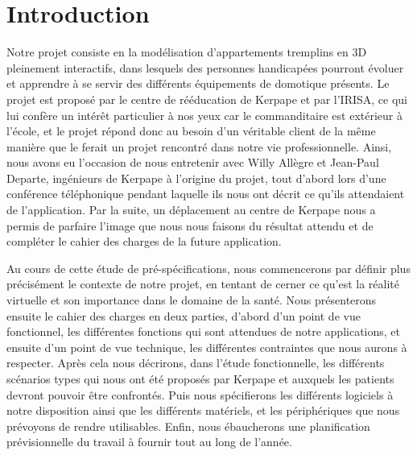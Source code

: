 \section{Introduction}

Notre projet consiste en la modélisation d'appartements tremplins en 3D pleinement interactifs, dans lesquels des personnes handicapées pourront évoluer et apprendre à se servir des différents équipements de domotique présents. 
Le projet est proposé par le centre de rééducation de Kerpape et par l'IRISA, ce qui lui confère un intérêt particulier à nos yeux car le commanditaire est extérieur à l'école, et le projet répond donc au besoin d'un véritable client de la même manière que le ferait un projet rencontré dans notre vie professionnelle. 
Ainsi, nous avons eu l'occasion de nous entretenir avec Willy Allègre et Jean-Paul Departe, ingénieurs de Kerpape à l'origine du projet, tout d'abord lors d'une conférence téléphonique pendant laquelle ils nous ont décrit ce qu'ils attendaient de l'application. Par la suite, un déplacement au centre de Kerpape nous a permis de parfaire l'image que nous nous faisons du résultat attendu et de compléter le cahier des charges de la future application. \newline

Au cours de cette étude de pré-spécifications, nous commencerons par définir plus précisément le contexte de notre projet, en tentant de cerner ce qu'est la réalité virtuelle et son importance dans le domaine de la santé. 
Nous présenterons ensuite le cahier des charges en deux parties, d'abord d'un point de vue fonctionnel, les différentes fonctions qui sont attendues de notre applications, et ensuite d'un point de vue technique, les différentes contraintes que nous aurons à respecter. 
Après cela nous décrirons, dans l'étude fonctionnelle, les différents scénarios types qui nous ont été proposés par Kerpape et auxquels les patients devront pouvoir être confrontés. 
Puis nous spécifierons les différents logiciels à notre disposition ainsi que les différents matériels, et les périphériques que nous prévoyons de rendre utilisables. 
Enfin, nous ébaucherons une planification prévisionnelle du travail à fournir tout au long de l'année. 